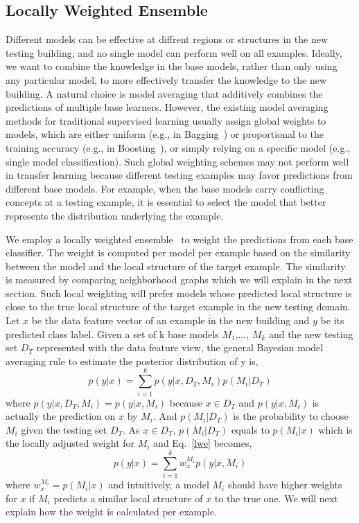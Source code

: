 \subsection{Locally Weighted Ensemble}
Different models can be effective at diffrent regions or structures in the new testing building, and no single model can perform well on all examples. 
Ideally, we want to combine the knowledge in the base models, rather than only using any particular model, to more effectively transfer the knowledge to the new building. A natural choice is model averaging that additively combines the predictions of multiple base learners. 
However, the existing model averaging methods for traditional supervised learning usually assign global weights to models, which are either uniform (e.g., in Bagging~\cite{bagging}) or proportional to the training accuracy (e.g., in Boosting~\cite{boosting}), or simply relying on a specific model (e.g., single model classification).
Such global weighting schemes may not perform well in transfer learning because different testing examples may favor predictions from different base models. 
For example, when the base models carry conflicting concepts at a testing example, it is essential to select the model that better represents the distribution underlying the example.

We employ a locally weighted ensemble~\cite{lwe} to weight the predictions from each base classifier. The weight is computed per model per example based on the similarity between the model and the local structure of the target example. The similarity is measured by comparing neighborhood graphs which we will explain in the next section. Such local weighting will prefer models whose predicted local structure is close to the true local structure of the target example in the new testing domain. Let $x$ be the data feature vector of an example in the new building and $y$ be its predicted class label. Given a set of k base models $M_1$,..., $M_k$ and the new testing set $D_T$ represented with the data feature view, the general Bayesian model averaging rule to estimate the posterior distribution of y is,
\begin{equation}\label{lwe}
p(y|x)=\sum_{i=1}^k p(y|x,D_T,M_i) p(M_i|D_T)
\end{equation}
where $p(y|x,D_T,M_i) = p(y|x,M_i)$ because $x \in D_T$ and $p(y|x,M_i)$ is actually the prediction on $x$ by $M_i$. And $p(M_i|D_T)$ is the probability to choose $M_i$ given the testing set $D_T$. As $x \in D_T$, $p(M_i|D_T)$ equals to $p(M_i|x)$ which is the locally adjusted weight for $M_i$ and Eq.~\ref{lwe} becomes,
\begin{equation}\label{sum}
p(y|x)=\sum_{i=1}^k w_{x}^{M_i} p(y|x, M_i)
\end{equation}
where $w_{x}^{M_i} = p(M_i|x)$ and intuitively, a model $M_i$ should have higher weights for $x$ if $M_i$ predicts a similar local structure of $x$ to the true one.
We will next explain how the weight is calculated per example.

